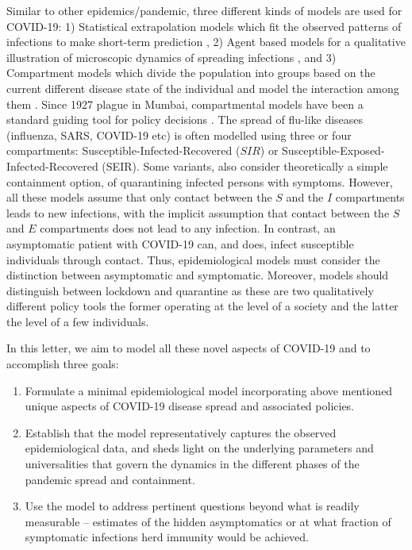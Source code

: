 \documentclass[aps,prl,reprint,superscriptaddress]{revtex4-1}
\begin{document}
Similar to other epidemics/pandemic,  three different kinds of models are used for COVID-19: 1) Statistical extrapolation models which fit the observed patterns of infections to make short-term prediction \cite{covid2020forecasting, prakash2020minimal}, 2) Agent based models for a qualitative illustration of microscopic dynamics of  spreading infections  \cite{singh2020age}, and 3) Compartment models which divide the population into groups based on the current different disease state of the individual and model the interaction among them \cite{robinson2013model,rock2014dynamics,adam2020special,enserink2020mathematics}. Since 1927 plague in Mumbai, compartmental models have been a standard guiding tool for policy decisions \cite{ExactSIR}. The spread of flu-like diseases (influenza, SARS, COVID-19 etc) is often modelled using three or four compartments: Susceptible-Infected-Recovered ($SIR$) or Susceptible-Exposed-Infected-Recovered (SEIR). Some variants, also consider theoretically a simple containment option, of quarantining infected persons with symptoms. However, all these models assume that only contact between the $S$ and the $I$ compartments leads to new infections, with the implicit assumption that contact between the $S$ and $E$ compartments does not lead to any infection. In contrast, an asymptomatic patient with COVID-19 can, and does, infect susceptible individuals through contact. Thus, epidemiological models must consider the distinction between asymptomatic and symptomatic. Moreover, models should distinguish between lockdown and quarantine as these are two qualitatively different policy tools the former operating at the level of a society and the latter the level of a few individuals.

In this letter,  we aim to model all these novel aspects of COVID-19 and to accomplish three goals:
\begin{enumerate}
\item Formulate a minimal epidemiological model incorporating above mentioned  unique aspects of COVID-19 disease spread and associated policies.
\item Establish that the model representatively captures the observed epidemiological data, and sheds light on the underlying parameters and universalities that govern the dynamics in the different phases of the pandemic spread and containment.
\item Use the model to address pertinent questions beyond what is readily measurable -- estimates of the hidden asymptomatics or at what fraction of symptomatic infections herd immunity would be achieved.
\end{enumerate}
\end{document}
